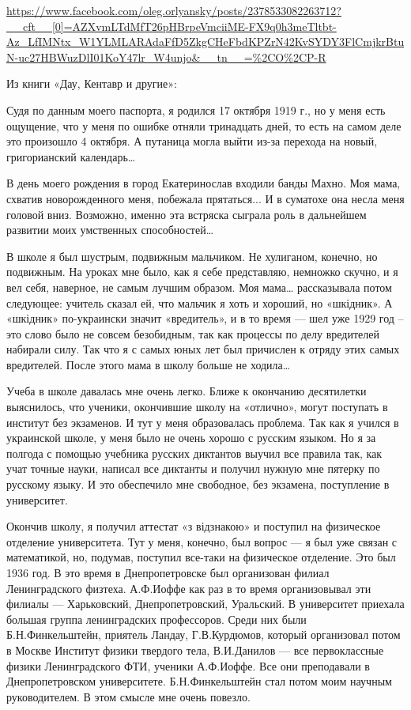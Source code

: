 \url{https://www.facebook.com/oleg.orlyansky/posts/2378533082263712?__cft__[0]=AZXvmLTdMfT26pHBrpeVmciiME-FX9q0h3meTltbt-Az_LfIMNtx_W1YLMLARAdaFfD5ZkgCHeFbdKPZrN42KvSYDY3FlCmjkrBtuN-uc27HBWuzDlI01KoY47lr_W4unjo&__tn__=%2CO%2CP-R}

Из книги «Дау, Кентавр и другие»:

Судя по данным моего паспорта, я родился 17 октября 1919 г., но у меня есть
ощущение, что у меня по ошибке отняли тринадцать дней, то есть на самом деле
это произошло 4 октября. А путаница могла выйти из-за перехода на новый,
григорианский календарь… 

В день моего рождения в город Екатеринослав входили банды Махно. Моя мама,
схватив новорожденного меня, побежала прятаться... И в суматохе она несла меня
головой вниз. Возможно, именно эта встряска сыграла роль в дальнейшем развитии
моих умственных способностей…

В школе я был шустрым, подвижным мальчиком. Не хулиганом, конечно, но
подвижным. На уроках мне было, как я себе представляю, немножко скучно, и я вел
себя, наверное, не самым лучшим образом. Моя мама… рассказывала потом
следующее: учитель сказал ей, что мальчик я хоть и хороший, но «шкідник». А
«шкідник» по-украински значит «вредитель», и в то время --- шел уже 1929 год –
это слово было не совсем безобидным, так как процессы по делу вредителей
набирали силу. Так что я с самых юных лет был причислен к отряду этих самых
вредителей. После этого мама в школу больше не ходила…

Учеба в школе давалась мне очень легко. Ближе к окончанию десятилетки
выяснилось, что ученики, окончившие школу на «отлично», могут поступать в
институт без экзаменов. И тут у меня образовалась проблема. Так как я учился в
украинской школе, у меня было не очень хорошо с русским языком. Но я за полгода
с помощью учебника русских диктантов выучил все правила так, как учат точные
науки, написал все диктанты и получил нужную мне пятерку по русскому языку. И
это обеспечило мне свободное, без экзамена, поступление в университет.

Окончив школу, я получил аттестат «з відзнакою» и поступил на физическое
отделение университета. Тут у меня, конечно, был вопрос --- я был уже связан с
математикой, но, подумав, поступил все-таки на физическое отделение. Это был
1936 год. В это время в Днепропетровске был организован филиал Ленинградского
физтеха. А.Ф.Иоффе как раз в то время организовывал эти филиалы --- Харьковский,
Днепропетровский, Уральский. В университет приехала большая группа
ленинградских профессоров. Среди них были Б.Н.Финкельштейн, приятель Ландау,
Г.В.Курдюмов, который организовал потом в Москве Институт физики твердого тела,
В.И.Данилов --- все первоклассные физики Ленинградского ФТИ, ученики А.Ф.Иоффе.
Все они преподавали в Днепропетровском университете. Б.Н.Финкельштейн стал
потом моим научным руководителем. В этом смысле мне очень повезло.

